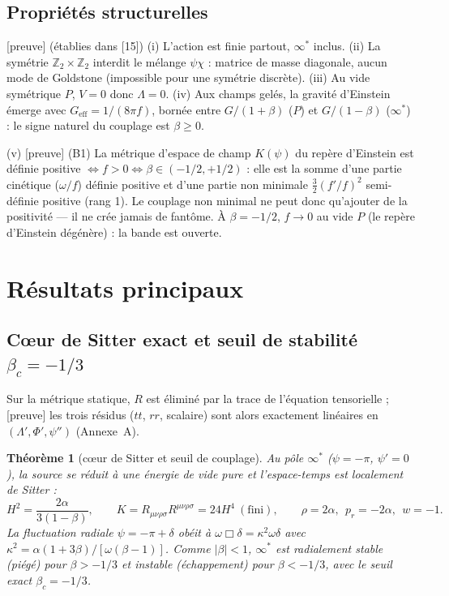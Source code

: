 \documentclass[11pt,a4paper]{article}
\newcommand{\statut}[1]{{\footnotesize\textsf{[#1]}}}
\theoremstyle{plain}
\newtheorem{theoreme}{Th\'eor\`eme}
\theoremstyle{remark}
\begin{document}
\subsection{Propri\'et\'es structurelles}
\statut{preuve} (\'etablies dans [15]) (i) L'action est finie partout, $\infty^*$ inclus.
(ii) La sym\'etrie $\mathbb{Z}_2\times\mathbb{Z}_2$ interdit le m\'elange $\psi\chi$ :
matrice de masse diagonale, aucun mode de Goldstone (impossible pour une sym\'etrie
discr\`ete). (iii) Au vide sym\'etrique $P$, $V=0$ donc $\Lambda=0$. (iv) Aux champs gel\'es,
la gravit\'e d'Einstein \'emerge avec $G_{\mathrm{eff}}=1/(8\pi f)$, born\'ee entre
$G/(1+\beta)$ ($P$) et $G/(1-\beta)$ ($\infty^*$) : le signe naturel du couplage est
$\beta\ge0$.
\par\smallskip
(v) \statut{preuve} (B1) La m\'etrique d'espace de champ $K(\psi)$ du repère d'Einstein
est d\'efinie positive $\Leftrightarrow f>0\Leftrightarrow\beta\in(-1/2,+1/2)$ : elle est
la somme d'une partie cin\'etique ($\omega/f$) d\'efinie positive et d'une partie non
minimale $\tfrac32(f'/f)^2$ semi-d\'efinie positive (rang 1). Le couplage non minimal ne
peut donc qu'ajouter de la positivit\'e --- il ne cr\'ee jamais de fant\^ome. \`A
$\beta=-1/2$, $f\to0$ au vide $P$ (le repère d'Einstein d\'eg\'en\`ere) : la bande est ouverte.

\section{R\'esultats principaux}
\subsection{C\oe ur de Sitter exact et seuil de stabilit\'e $\beta_c=-1/3$}
Sur la m\'etrique statique, $R$ est \'elimin\'e par la trace de l'\'equation tensorielle ;
\statut{preuve} les trois r\'esidus ($tt$, $rr$, scalaire) sont alors exactement
lin\'eaires en $(\Lambda',\Phi',\psi'')$ (Annexe~A).

\begin{theoreme}[c\oe ur de Sitter et seuil de couplage]\label{thm:core}
Au p\^ole $\infty^*$ ($\psi=-\pi$, $\psi'=0$), la source se r\'eduit \`a une \'energie de
vide pure et l'espace-temps est localement de Sitter :
\begin{equation}
H^2=\frac{2\alpha}{3(1-\beta)},\qquad K=R_{\mu\nu\rho\sigma}R^{\mu\nu\rho\sigma}=24H^4\ (\text{fini}),
\qquad \rho=2\alpha,\ \ p_r=-2\alpha,\ \ w=-1.
\end{equation}
La fluctuation radiale $\psi=-\pi+\delta$ ob\'eit \`a $\omega\Box\delta=\kappa^2\omega\delta$
avec $\kappa^2=\alpha(1+3\beta)/[\omega(\beta-1)]$. Comme $|\beta|<1$, $\infty^*$ est
radialement stable (pi\'eg\'e) pour $\beta>-1/3$ et instable (\'echappement) pour
$\beta<-1/3$, avec le seuil exact $\boxed{\beta_c=-1/3}$.
\end{theoreme}
\end{document}
